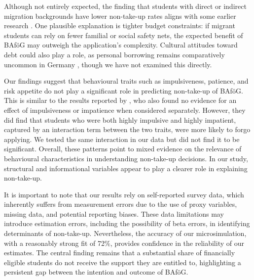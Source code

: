 Although not entirely expected, the finding that students with direct or indirect migration backgrounds have lower non-take-up rates aligns with some earlier research \citep{herber_non-take-up_2019, konijn_quantifying_2023}. One plausible explanation is tighter budget constraints: if migrant students can rely on fewer familial or social safety nets, the expected benefit of BAföG may outweigh the application’s complexity. Cultural attitudes toward debt could also play a role, as personal borrowing remains comparatively uncommon in Germany \citep{seabrooke_germany_2017}, though we have not examined this directly. 


Our findings suggest that behavioural traits such as impulsiveness, patience, and risk appetite do not play a significant role in predicting non-take-up of BAföG. This is similar to the results reported by \cite{herber_non-take-up_2019}, who also found no evidence for an effect of impulsiveness or impatience when considered separately. However, they did find that students who were both highly impulsive and highly impatient, captured by an interaction term between the two traits, were more likely to forgo applying. We tested the same interaction in our data but did not find it to be significant. Overall, these patterns point to mixed evidence on the relevance of behavioural characteristics in understanding non-take-up decisions. In our study, structural and informational variables appear to play a clearer role in explaining non-take-up.


It is important to note that our results rely on self-reported survey data, which inherently suffers from measurement errors due to the use of proxy variables, missing data, and potential reporting biases. 
These data limitations may introduce estimation errors, including the possibility of beta errors, in identifying determinants of non-take-up. 
Nevertheless, the accuracy of our microsimulation, with a reasonably strong fit of 72\%, provides confidence in the reliability of our estimates. 
The central finding remains that a substantial share of financially eligible students do not receive the support they are entitled to, highlighting a persistent gap between the intention and outcome of BAföG.

